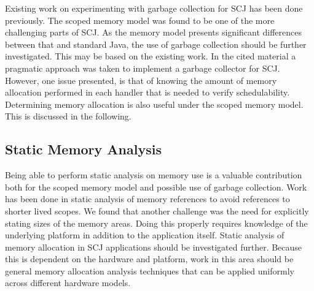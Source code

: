 Existing work on experimenting with garbage collection for SCJ has been done previously\cite{Schoeberl:2007:GCS:1288940.1288953}. The scoped memory model was found to be one of the more challenging parts of SCJ. As the memory model presents significant differences between that and standard Java, the use of garbage collection should be further investigated. This may be based on the existing work. In the cited material a pragmatic approach was taken to implement a garbage collector for SCJ. However, one issue presented, is that of knowing the amount of memory allocation performed in each handler that is needed to verify schedulability. Determining memory allocation is also useful under the scoped memory model. This is discussed in the following.

\subsection{Static Memory Analysis} %
\label{sub:memoryanalysis}
Being able to perform static analysis on memory use is a valuable contribution both for the scoped memory model and possible use of garbage collection. Work has been done in static analysis of memory references to avoid references to shorter lived scopes\cite{Dalsgaard:2012:PMA:2388936.2388939}. We found that another challenge was the need for explicitly stating sizes of the memory areas. Doing this properly requires knowledge of the underlying platform in addition to the application itself. Static analysis of memory allocation in SCJ applications should be investigated further. Because this is dependent on the hardware and platform, work in this area should be general memory allocation analysis techniques that can be applied uniformly across different hardware models.


